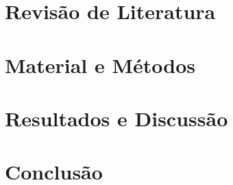 \documentclass[
	12pt,				%
	openright,			%
	oneside,			%
	a4paper,			%
	brazil				%
	]{abntex2}
\begin{document}
\chapter{Revisão de Literatura} 
\label{chap:revi}


\chapter{Material e Métodos} 
\label{chap:mati}


\chapter{Resultados e Discussão} 
\label{chap:resul}


\chapter{Conclusão} 
\label{chap:conc}






\postextual




% 


\begin{anexosenv}

\partanexos
\renewcommand{\ABNTEXchapterfontsize}{\ABNTEXsectionfont}



\end{anexosenv}
\end{document}
